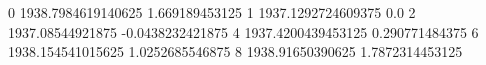 0 1938.7984619140625 1.669189453125
1 1937.1292724609375 0.0
2 1937.08544921875 -0.0438232421875
4 1937.4200439453125 0.290771484375
6 1938.154541015625 1.0252685546875
8 1938.91650390625 1.7872314453125
